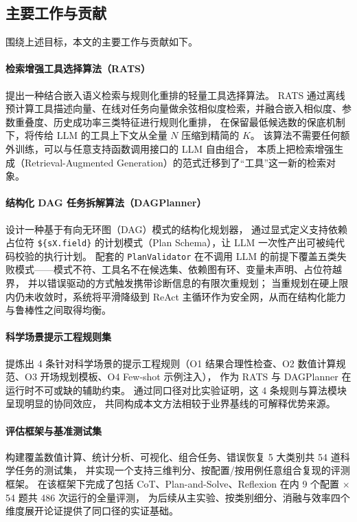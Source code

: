 \subsection{主要工作与贡献}

围绕上述目标，本文的主要工作与贡献如下。

\paragraph{检索增强工具选择算法（RATS）}
提出一种结合嵌入语义检索与规则化重排的轻量工具选择算法。
RATS 通过离线预计算工具描述向量、在线对任务向量做余弦相似度检索，并融合嵌入相似度、参数重叠度、历史成功率三类特征进行规则化重排，
在保留最低候选数的保底机制下，将传给 LLM 的工具上下文从全量 $N$ 压缩到精简的 $K$。
该算法不需要任何额外训练，可以与任意支持函数调用接口的 LLM 自由组合，
本质上把检索增强生成（Retrieval-Augmented Generation）的范式迁移到了“工具”这一新的检索对象。

\paragraph{结构化 DAG 任务拆解算法（DAGPlanner）}
设计一种基于有向无环图（DAG）模式的结构化规划器，
通过显式定义支持依赖占位符 \texttt{\$\{sX.field\}} 的计划模式（Plan Schema），让 LLM 一次性产出可被纯代码校验的执行计划。
配套的 \texttt{PlanValidator} 在不调用 LLM 的前提下覆盖五类失败模式——模式不符、工具名不在候选集、依赖图有环、变量未声明、占位符越界，
并以错误驱动的方式触发携带诊断信息的有限次重规划；
当重规划在硬上限内仍未收敛时，系统将平滑降级到 ReAct 主循环作为安全网，从而在结构化能力与鲁棒性之间取得均衡。

\paragraph{科学场景提示工程规则集}
提炼出 4 条针对科学场景的提示工程规则（O1 结果合理性检查、O2 数值计算规范、O3 开场规划模板、O4 Few-shot 示例注入），
作为 RATS 与 DAGPlanner 在运行时不可或缺的辅助约束。
通过同口径对比实验证明，这 4 条规则与算法模块呈现明显的协同效应，
共同构成本文方法相较于业界基线的可解释优势来源。

\paragraph{评估框架与基准测试集}
构建覆盖数值计算、统计分析、可视化、组合任务、错误恢复 5 大类别共 54 道科学任务的测试集，
并实现一个支持三维判分、按配置/按用例任意组合复现的评测框架。
在该框架下完成了包括 CoT、Plan-and-Solve、Reflexion 在内 9 个配置 $\times$ 54 题共 486 次运行的全量评测，
为后续从主实验、按类别细分、消融与效率四个维度展开论证提供了同口径的实证基础。

